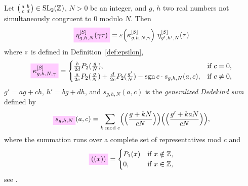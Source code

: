 \documentclass{article}
\begin{document}
\begin{Lemma}
  \label{thm:Generalized-Eta-Transformation-Schoeneberg}
  Let
  $\left(\begin{smallmatrix}a&b\\c&d\end{smallmatrix}\right) \in
  \SL2Z$, $N>0$ be an integer, and $g$, $h$ two real numbers not
  simultaneously congruent to 0 modulo $N$.
  Then
  \begin{gather}
    \label{eq:eta_g-h-N^[S](gamma*tau)}
    \defineNotation[eta-g-h-N-gamma-tau-Schoeneberg]%
      {\eta_{g,h,N}^{[S]}(\gamma\tau)}
    =
    \unityPower{\kappa_{g,h,N,\gamma}^{[S]}} \, \eta_{g',h',N}^{[S]}(\tau)
  \end{gather}
  where $\varepsilon$ is defined in Definition~\ref{def:epsilon},
  \begin{gather}
    \defineNotation[kappa-g-h-N-gamma-Schoeneberg]{\kappa_{g,h,N,\gamma}^{[S]}}
    =
    \begin{cases}
      \frac{b}{2d} P_2(\frac{g}{N}), &\text{if $c=0$},
      \\
      \frac{a}{2c} P_2(\frac{g}{N})
        + \frac{d}{2c} P_2(\frac{g'}{N})
        - \sign c \cdot s_{g,h,N}(a,c),
      &
      \text{if $c\not=0$},
    \end{cases}
    \label{eq:kappa_g-h-N-gamma-Schoeneberg}
  \end{gather}
  $g'=ag+ch$, $h'=bg+dh$, and $s_{g,h,N}(a,c)$ is the
  \emph{generalized Dedekind sum} defined by
  \begin{gather}
    \defineNotation[s-g-h-N]{s_{g,h,N}}(a,c)
    =
    \sum_{k \bmod c}
    \Bigl(\Bigl( \frac{g + k N}{c N} \Bigr)\Bigr)
    \Bigl(\Bigl( \frac{g' + k a N}{c N} \Bigr)\Bigr),
    \label{eq:s_g-h-N}
  \end{gather}
  where the summation runs over a complete set of representatives mod
  $c$ and
  \begin{gather*}
    \defineNotation[x-P1-0]{((x))}
    =
    \begin{cases}
      P_1(x) & \text{if $x\notin\setZ$},
      \\
      0, & \text{if $x \in \setZ$},
    \end{cases}
  \end{gather*}
  see \cite[p.~673]{Yang_GeneralizedDedekindEtaFunctions_2004}.
\end{Lemma}
\end{document}
